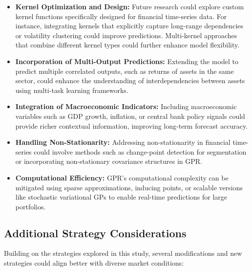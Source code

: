 \begin{itemize}
    \item \textbf{Kernel Optimization and Design:} Future research could explore custom kernel functions specifically designed for financial time-series data. For instance, integrating kernels that explicitly capture long-range dependencies or volatility clustering could improve predictions. Multi-kernel approaches that combine different kernel types could further enhance model flexibility.
    \item \textbf{Incorporation of Multi-Output Predictions:} Extending the model to predict multiple correlated outputs, such as returns of assets in the same sector, could enhance the understanding of interdependencies between assets using multi-task learning frameworks.
    \item \textbf{Integration of Macroeconomic Indicators:} Including macroeconomic variables such as GDP growth, inflation, or central bank policy signals could provide richer contextual information, improving long-term forecast accuracy.
    \item \textbf{Handling Non-Stationarity:} Addressing non-stationarity in financial time-series could involve methods such as change-point detection for segmentation or incorporating non-stationary covariance structures in GPR.
    \item \textbf{Computational Efficiency:} GPR's computational complexity can be mitigated using sparse approximations, inducing points, or scalable versions like stochastic variational GPs to enable real-time predictions for large portfolios.
\end{itemize}

\subsection{Additional Strategy Considerations}
Building on the strategies explored in this study, several modifications and new strategies could align better with diverse market conditions:

